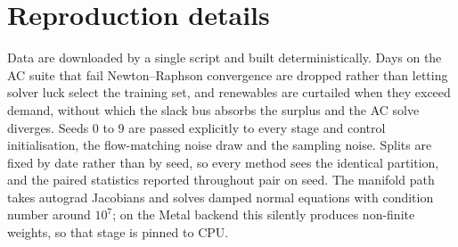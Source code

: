 \documentclass{article}
\begin{document}
\section{Reproduction details}\label{app:repro}
Data are downloaded by a single script and built deterministically. Days on
the AC suite that fail Newton--Raphson convergence are dropped rather than letting
solver luck select the training set, and renewables are curtailed when they exceed
demand, without which the slack bus absorbs the surplus and the AC solve diverges.
Seeds 0 to 9 are passed explicitly to every stage and control initialisation, the
flow-matching noise draw and the sampling noise. Splits are fixed by date rather than by
seed, so every method sees the identical partition, and the paired statistics reported
throughout pair on seed. The manifold path takes autograd Jacobians and solves damped
normal equations with condition number around $10^{7}$; on the Metal backend this
silently produces non-finite weights, so that stage is pinned to CPU.
\end{document}
